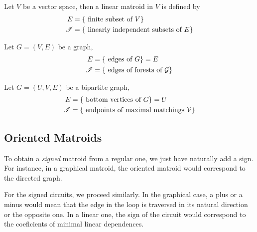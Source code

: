 \begin{definition}
    Let $V$ be a vector space, then a linear matroid in $V$ is defined by
    \begin{equation*}
        \begin{split}
            E & = \lbrace \text{ finite subset of } V \rbrace \\
            \mathscr{I} & = \lbrace \text{ linearly independent subsets of } E \rbrace
        \end{split}
    \end{equation*}
\end{definition}

\begin{definition}
    Let $G = (V, E)$ be a graph,
    \begin{equation*}
        \begin{split}
            E & = \lbrace \text{ edges of } G \rbrace = E \\
            \mathscr{I} & = \lbrace \text{ edges of forests of } \mathcal{G} \rbrace
        \end{split}
    \end{equation*}
\end{definition}

\begin{definition}
    Let $G = (U, V, E)$ be a bipartite graph,
    \begin{equation*}
        \begin{split}
            E & = \lbrace \text{ bottom vertices of } G \rbrace = U \\
            \mathscr{I} & = \lbrace \text{ endpoints of maximal matchings } \mathcal{V} \rbrace
        \end{split}
    \end{equation*}
\end{definition}

\subsection{Oriented Matroids}

To obtain a \textit{signed} matroid from a regular one, we just have naturally add a sign.
For instance, in a graphical matroid, the oriented matroid would correspond to the directed graph.

For the signed circuits, we proceed similarly.
In the graphical case, a plus or a minus would mean that the edge in the loop is traversed in its natural direction or the opposite one.
In a linear one, the sign of the circuit would correspond to the coeficients of minimal linear dependences.

